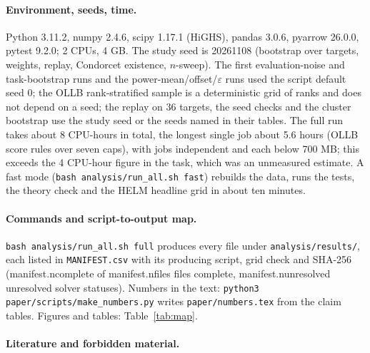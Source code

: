 \paragraph{Environment, seeds, time.}
Python 3.11.2, numpy 2.4.6, scipy 1.17.1 (HiGHS), pandas 3.0.6, pyarrow 26.0.0, pytest 9.2.0; 2 CPUs, 4 GB. The study seed is 20261108 (bootstrap over targets, weights, replay, Condorcet existence, $n$-sweep). The first evaluation-noise and task-bootstrap runs and the power-mean/offset/$\varepsilon$ runs used the script default seed 0; the OLLB rank-stratified sample is a deterministic grid of ranks and does not depend on a seed; the replay on 36 targets, the seed checks and the cluster bootstrap use the study seed or the seeds named in their tables. The full run takes about 8 CPU-hours in total, the longest single job about 5.6 hours (OLLB score rules over seven caps), with jobs independent and each below 700 MB; this exceeds the 4 CPU-hour figure in the task, which was an unmeasured estimate. A fast mode (\texttt{bash analysis/run\_all.sh fast}) rebuilds the data, runs the tests, the theory check and the HELM headline grid in about ten minutes.

\paragraph{Commands and script-to-output map.}
\texttt{bash analysis/run\_all.sh full} produces every file under \texttt{analysis/results/}, each listed in \texttt{MANIFEST.csv} with its producing script, grid check and SHA-256 (\num{manifest.ncomplete} of \num{manifest.nfiles} files complete, \num{manifest.nunresolved} unresolved solver statuses). Numbers in the text: \texttt{python3 paper/scripts/make\_numbers.py} writes \texttt{paper/numbers.tex} from the claim tables. Figures and tables: Table~\ref{tab:map}.


\paragraph{Literature and forbidden material.}


